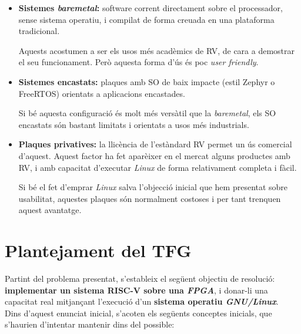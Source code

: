 \documentclass{article}
\begin{document}
\begin{itemize}
\item \textbf{Sistemes \textit{baremetal}:} software corrent directament sobre el processador, sense sistema operatiu, i compilat de forma creuada en una plataforma tradicional.

Aquests acostumen a ser els usos més acadèmics de RV, de cara a demostrar el seu funcionament. Però aquesta forma d'ús és poc \textit{user friendly}.

\item \textbf{Sistemes encastats:} plaques amb SO de baix impacte (estil Zephyr o FreeRTOS) orientats a aplicacions encastades.

Si bé aquesta configuració és molt més versàtil que la \textit{baremetal}, els SO encastats són bastant limitats i orientats a usos més industrials.

\item \textbf{Plaques privatives:} la llicència de l'estàndard RV permet un ús comercial d'aquest. Aquest factor ha fet aparèixer en el mercat alguns productes amb RV, i amb capacitat d'executar \textit{Linux} de forma relativament completa i fàcil.

Si bé el fet d'emprar \textit{Linux} salva l'objecció inicial que hem presentat sobre usabilitat, aquestes plaques són normalment costoses i per tant trenquen aquest avantatge.
\end{itemize}

\section{Plantejament del TFG}

Partint del problema presentat, s'estableix el següent objectiu de resolució: \textbf{implementar un sistema RISC-V sobre una \textit{FPGA}}, i donar-li una capacitat real mitjançant l'execució d'un \textbf{sistema operatiu \textit{GNU/Linux}}.\\

Dins d'aquest enunciat inicial, s'acoten els següents conceptes inicials, que s'haurien d'intentar mantenir dins del possible:
\end{document}
